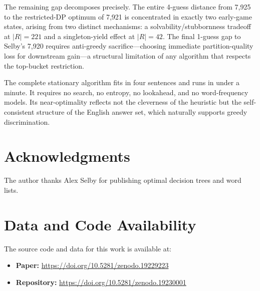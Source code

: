 \documentclass[11pt]{article}
\begin{document}
	The remaining gap decomposes precisely.  The entire 4-guess distance from 7,925 to the restricted-DP optimum of 7,921 is concentrated in exactly two early-game states, arising from two distinct mechanisms: a solvability/stubbornness tradeoff at $|R| = 221$ and a singleton-yield effect at $|R| = 42$.  The final 1-guess gap to Selby's 7,920 requires anti-greedy sacrifice---choosing immediate partition-quality loss for downstream gain---a structural limitation of any algorithm that respects the top-bucket restriction.
	
	The complete stationary algorithm fits in four sentences and runs in under a minute.  It requires no search, no entropy, no lookahead, and no word-frequency models.  Its near-optimality reflects not the cleverness of the heuristic but the self-consistent structure of the English answer set, which naturally supports greedy discrimination.
	
	\section*{Acknowledgments}
	
	The author thanks Alex Selby for publishing optimal decision trees and word lists.
	
	
	\section*{Data and Code Availability}
	
	The source code and data for this work is available at:
	\begin{itemize}
		\item \textbf{Paper:} \url{https://doi.org/10.5281/zenodo.19229223}
		\item \textbf{Repository:} \url{https://doi.org/10.5281/zenodo.19230001}
	\end{itemize}
	
\end{document}
